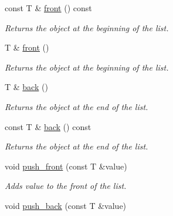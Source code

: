 \begin{DoxyCompactItemize}
\mbox{\label{classls_1_1list_ad4db2fb23d8774b280f6e8d0f49166c0}} 
const T \& \hyperlink{classls_1_1list_ad4db2fb23d8774b280f6e8d0f49166c0}{front} () const
\begin{DoxyCompactList}\small\item\em Returns the object at the beginning of the list. \end{DoxyCompactList}\item 
\mbox{\label{classls_1_1list_a7429ad77511be5fe6f165a80c1dc7d02}} 
T \& \hyperlink{classls_1_1list_a7429ad77511be5fe6f165a80c1dc7d02}{front} ()
\begin{DoxyCompactList}\small\item\em Returns the object at the beginning of the list. \end{DoxyCompactList}\item 
\mbox{\label{classls_1_1list_a1439d9f2b9441ffe3e6c0c8111b29cb1}} 
T \& \hyperlink{classls_1_1list_a1439d9f2b9441ffe3e6c0c8111b29cb1}{back} ()
\begin{DoxyCompactList}\small\item\em Returns the object at the end of the list. \end{DoxyCompactList}\item 
\mbox{\label{classls_1_1list_a76c0d5952f1843c0f1183f5acb144103}} 
const T \& \hyperlink{classls_1_1list_a76c0d5952f1843c0f1183f5acb144103}{back} () const
\begin{DoxyCompactList}\small\item\em Returns the object at the end of the list. \end{DoxyCompactList}\item 
\mbox{\label{classls_1_1list_a3ae27bac754d4ca95da34c9040f33d48}} 
void \hyperlink{classls_1_1list_a3ae27bac754d4ca95da34c9040f33d48}{push\+\_\+front} (const T \&value)
\begin{DoxyCompactList}\small\item\em Adds value to the front of the list. \end{DoxyCompactList}\item 
\mbox{\label{classls_1_1list_a21438e1be5b2143896ee8480cb2beb18}} 
void \hyperlink{classls_1_1list_a21438e1be5b2143896ee8480cb2beb18}{push\+\_\+back} (const T \&value)

\end{DoxyCompactItemize}
